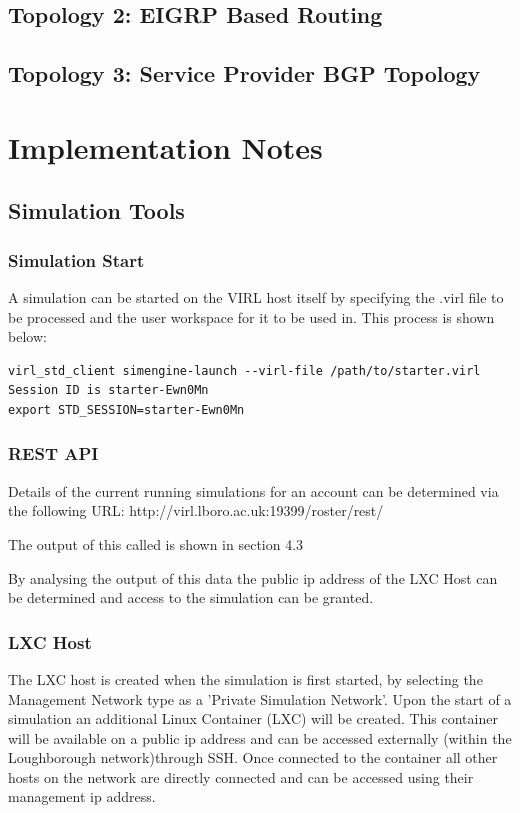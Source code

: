 \documentclass[11pt]{report}
\begin{document}
\section{Topology 2: EIGRP Based Routing}

\section{Topology 3: Service Provider BGP Topology}

\chapter*{Implementation Notes}

\section*{Simulation Tools}

\subsection*{Simulation Start}

A simulation can be started on the VIRL host itself by specifying the .virl file to be processed and the user workspace for it to be used in. This process is shown below:

\begin{lstlisting}
virl_std_client simengine-launch --virl-file /path/to/starter.virl
Session ID is starter-Ewn0Mn
export STD_SESSION=starter-Ewn0Mn
\end{lstlisting}

\subsection*{REST API}

Details of the current running simulations for an account can be determined via the following URL: http://virl.lboro.ac.uk:19399/roster/rest/

The output of this called is shown in section 4.3

By analysing the output of this data the public ip address of the LXC Host can be determined and access to the simulation can be granted.

\subsection*{LXC Host}

The LXC host is created when the simulation is first started, by selecting the Management Network type as a 'Private Simulation Network'. Upon the start of a simulation an additional Linux Container (LXC) will be created. This container will be available on a public ip address and can be accessed externally (within the Loughborough network)through SSH. Once connected to the container all other hosts on the network are directly connected and can be accessed using their management ip address.
\end{document}
